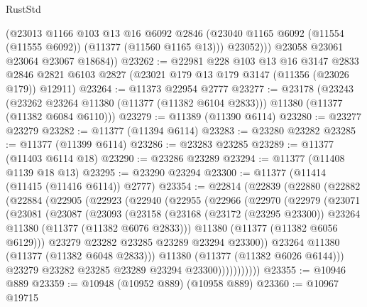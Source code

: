 \begin{lexlean}{RustStd}
\begin{coremodule}
            (@23013
              @1166
              @103
              @13
              @16
              @6092
              @2846
              (@23040 @1165 @6092 (@11554 (@11555 @6092)) (@11377 (@11560 @1165 @13)))
              @23052)))
        @23058
        @23061
        @23064
        @23067
        @18684))
@23262 := @22981
    @228
    @103
    @13
    @16
    @3147
    @2833
    @2846
    @2821
    @6103
    @2827
    (@23021 @179 @13 @179 @3147 (@11356 (@23026 @179)) @12911)
@23264 := @11373 @22954 @2777
@23277 := @23178
    (@23243
      (@23262 @23264 @11380 (@11377 (@11382 @6104 @2833)))
      @11380
      (@11377 (@11382 @6084 @6110)))
@23279 := @11389 (@11390 @6114)
@23280 := @23277 @23279
@23282 := @11377 (@11394 @6114)
@23283 := @23280 @23282
@23285 := @11377 (@11399 @6114)
@23286 := @23283 @23285
@23289 := @11377 (@11403 @6114 @18)
@23290 := @23286 @23289
@23294 := @11377 (@11408 @1139 @18 @13)
@23295 := @23290 @23294
@23300 := @11377 (@11414 (@11415 (@11416 @6114)) @2777)
@23354 := @22814
    (@22839
      (@22880
        (@22882
          (@22884
            (@22905
              (@22923
                (@22940
                  (@22955
                    (@22966
                      (@22970
                        (@22979
                          (@23071
                            (@23081
                              (@23087
                                (@23093
                                  (@23158
                                    (@23168
                                      (@23172 (@23295 @23300))
                                      @23264
                                      @11380
                                      (@11377 (@11382 @6076 @2833)))
                                    @11380
                                    (@11377 (@11382 @6056 @6129)))
                                  @23279
                                  @23282
                                  @23285
                                  @23289
                                  @23294
                                  @23300))
                              @23264
                              @11380
                              (@11377 (@11382 @6048 @2833)))
                            @11380
                            (@11377 (@11382 @6026 @6144)))
                          @23279
                          @23282
                          @23285
                          @23289
                          @23294
                          @23300)))))))))))
@23355 := @10946 @889
@23359 := @10948 (@10952 @889) (@10958 @889)
@23360 := @10967 @19715

\end{coremodule}
\end{lexlean}
